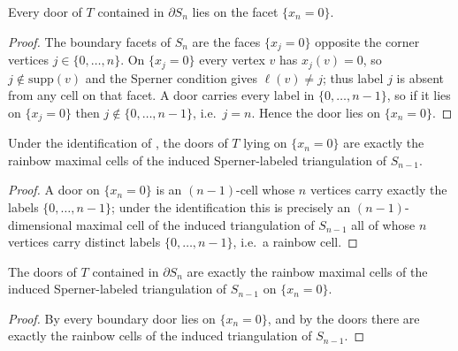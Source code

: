 \begin{lemma}
    \label{lem:boundary-doors-bottom}
    Every door of $T$ contained in $\partial S_n$ lies on the facet
    $\{x_n = 0\}$.
\end{lemma}
\begin{proof}
    The boundary facets of $S_n$ are the faces $\{x_j = 0\}$ opposite the corner
    vertices $j \in \{0, \dots, n\}$. On $\{x_j = 0\}$ every vertex $v$ has
    $x_j(v) = 0$, so $j \notin \mathrm{supp}(v)$ and the Sperner condition gives
    $\ell(v) \ne j$; thus label $j$ is absent from any cell on that facet. A door
    carries every label in $\{0, \dots, n-1\}$, so if it lies on $\{x_j = 0\}$
    then $j \notin \{0, \dots, n-1\}$, i.e.\ $j = n$. Hence the door lies on
    $\{x_n = 0\}$.
\end{proof}

\begin{lemma}
    \label{lem:bottom-facet-doors-rainbow}
    Under the identification of , the doors of $T$
    lying on $\{x_n = 0\}$ are exactly the rainbow maximal cells of the induced
    Sperner-labeled triangulation of $S_{n-1}$.
\end{lemma}
\begin{proof}
    A door on $\{x_n = 0\}$ is an $(n-1)$-cell whose $n$ vertices carry exactly
    the labels $\{0, \dots, n-1\}$; under the identification this is precisely an
    $(n-1)$-dimensional maximal cell of the induced triangulation of $S_{n-1}$ all
    of whose $n$ vertices carry distinct labels $\{0, \dots, n-1\}$, i.e.\ a
    rainbow cell.
\end{proof}

\begin{lemma}
    \label{lem:boundary-doors-facet}
    The doors of $T$ contained in $\partial S_n$ are exactly the rainbow maximal
    cells of the induced Sperner-labeled triangulation of $S_{n-1}$ on
    $\{x_n = 0\}$.
\end{lemma}
\begin{proof}
    By  every boundary door lies on $\{x_n = 0\}$,
    and by  the doors there are exactly the
    rainbow cells of the induced triangulation of $S_{n-1}$.
\end{proof}

